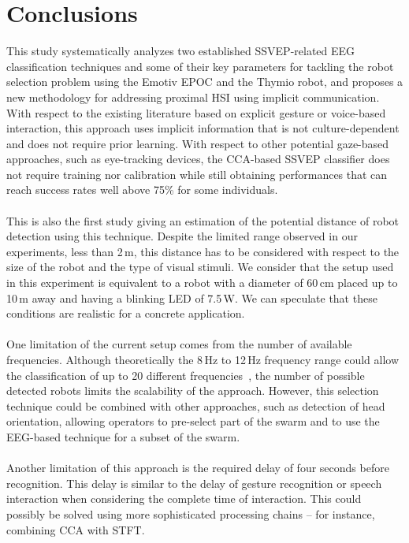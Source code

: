 \documentclass[smallextended]{svjour3}
\begin{document}
\section{Conclusions}
This study systematically analyzes two established SSVEP-related EEG classification techniques and some of their key parameters for tackling the robot selection problem using the Emotiv EPOC and the Thymio robot, and proposes a new methodology for addressing proximal HSI using implicit communication. 
With respect to the existing literature based on explicit gesture or voice-based interaction, this approach uses implicit information that is not culture-dependent and does not require prior learning. 
With respect to other potential gaze-based approaches, such as eye-tracking devices, the CCA-based SSVEP classifier does not require training nor calibration while still obtaining performances that can reach success rates well above 75\% for some individuals.\\
\\
This is also the first study giving an estimation of the potential distance of robot detection using this technique.
Despite the limited range observed in our experiments, less than 2\,m, this distance has to be considered with respect to the size of the robot and the type of visual stimuli. We consider that the setup used in this experiment is equivalent to a robot with a diameter of 60\,cm placed up to 10\,m away and having a blinking LED of 7.5\,W. 
We can speculate that these conditions are realistic for a concrete application.\\
\\
One limitation of the current setup comes from the number of available frequencies.
Although theoretically the 8\,Hz to 12\,Hz frequency range could allow the classification of up to 20 different frequencies~\cite{SSVEPfiability}, the number of possible detected robots limits the scalability of the approach. 
However, this selection technique could be combined with other approaches, such as detection of head orientation, allowing operators to pre-select part of the swarm and to use the EEG-based technique for a subset of the swarm.\\
\\
Another limitation of this approach is the required delay of four seconds before recognition.
This delay is similar to the delay of gesture recognition or speech interaction when considering the complete time of interaction.
This could possibly be solved using more sophisticated processing chains -- for instance, combining CCA with STFT.
\end{document}
